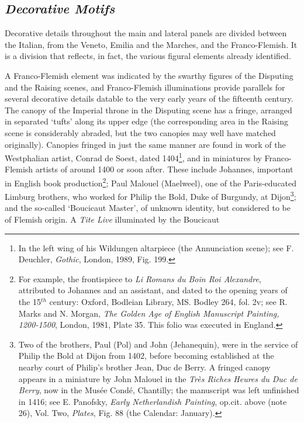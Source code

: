 \documentclass[a4paper,12pt]{article}
\begin{document}
\subsection{\textit{Decorative Motifs}}

Decorative details throughout the main and lateral panels are divided
between the Italian, from the Veneto, Emilia and the Marches, and the
Franco-Flemish. It is a division that reflects, in fact, the various
figural elements already identified.

A Franco-Flemish element was indicated by the swarthy figures of the
Disputing and the Raising scenes, and Franco-Flemish illuminations
provide parallels for several decorative details datable to the very
early years of the fifteenth century. The canopy of the Imperial
throne in the Disputing scene has a fringe, arranged in separated
`tufts' along its upper edge (the corresponding area in the Raising
scene is considerably abraded, but the two canopies may well have
matched originally).  Canopies fringed in just the same manner are
found in work of the Westphalian artist, Conrad de Soest, dated
1404\footnote{In the left wing of his Wildungen altarpiece (the
Annunciation scene); see F. Deuchler, \textit{Gothic}, London, 1989,
Fig. 199.}, and in miniatures by Franco-Flemish artists of around 1400
or soon after. These include Johannes, important in English book
production\footnote{For example, the frontispiece to \textit{Li Romans
du Boin Roi Alexandre}, attributed to Johannes and an assistant, and
dated to the opening years of the 15$^{th}$ century: Oxford, Bodleian
Library, MS. Bodley 264, fol. 2v; see R. Marks and N. Morgan,
\textit{The Golden Age of English Manuscript Painting, 1200-1500},
London, 1981, Plate 35. This folio was executed in England.}; Paul
Malouel (Maelweel), one of the Paris-educated Limburg brothers, who
worked for Philip the Bold, Duke of Burgundy, at Dijon\footnote{Two of
the brothers, Paul (Pol) and John (Jehanequin), were in the service of
Philip the Bold at Dijon from 1402, before becoming established at the
nearby court of Philip's brother Jean, Duc de Berry. A fringed canopy
appears in a miniature by John Malouel in the \textit{Tr\`es Riches
Heures du Duc de Berry}, now in the Mus\'ee Cond\'e, Chantilly; the
manuscript was left unfinished in 1416; see E. Panofsky, \textit{Early
Netherlandish Painting}, op.cit. above (note 26), Vol. Two,
\textit{Plates}, Fig. 88 (the Calendar: January).}; and the so-called
`Boucicaut Master', of unknown identity, but considered to be of
Flemish origin. A \textit{Tite Live} illuminated by the Boucicaut
\end{document}

